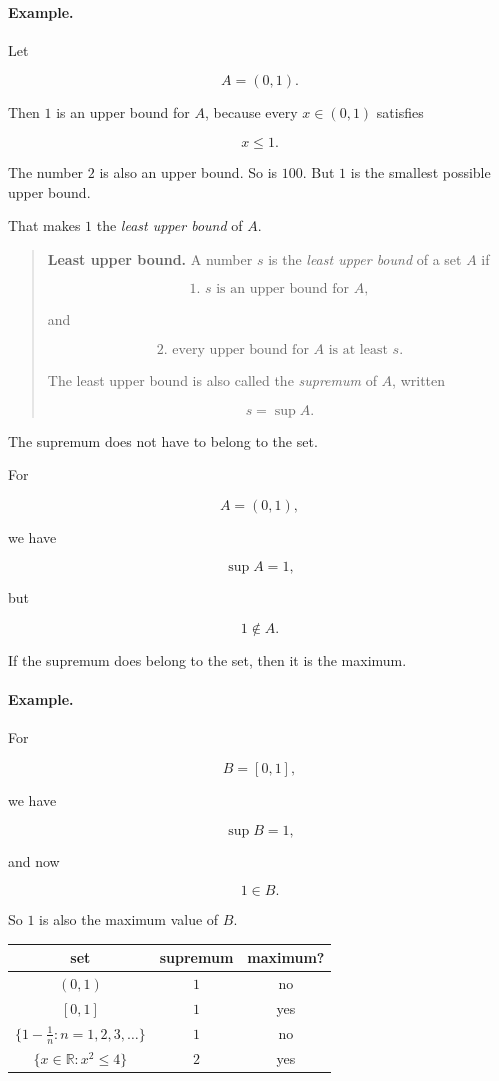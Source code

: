 \paragraph{Example.}
Let

\[
A=(0,1).
\]

Then \(1\) is an upper bound for \(A\), because every \(x\in(0,1)\) satisfies

\[
x\le1.
\]

The number \(2\) is also an upper bound.  So is \(100\).  But \(1\) is the smallest
possible upper bound.

That makes \(1\) the \emph{least upper bound} of \(A\).

\begin{quote}
\textbf{Least upper bound.}
A number \(s\) is the \emph{least upper bound} of a set \(A\) if

\[
\text{1. }s\text{ is an upper bound for }A,
\]

and

\[
\text{2. every upper bound for }A\text{ is at least }s.
\]

The least upper bound is also called the \emph{supremum} of \(A\), written

\[
\boxed{s=\sup A.}
\]
\end{quote}

The supremum does not have to belong to the set.

For

\[
A=(0,1),
\]

we have

\[
\sup A=1,
\]

but

\[
1\notin A.
\]

If the supremum does belong to the set, then it is the maximum.

\paragraph{Example.}
For

\[
B=[0,1],
\]

we have

\[
\sup B=1,
\]

and now

\[
1\in B.
\]

So \(1\) is also the maximum value of \(B\).

\begin{center}
\renewcommand{\arraystretch}{1.5}
\begin{tabular}{c|c|c}
\textbf{set} & \textbf{supremum} & \textbf{maximum?} \\ \hline
\((0,1)\) & \(1\) & no \\
\([0,1]\) & \(1\) & yes \\
\(\{1-\frac1n:n=1,2,3,\ldots\}\) & \(1\) & no \\
\(\{x\in\mathbb R:x^2\le4\}\) & \(2\) & yes
\end{tabular}
\end{center}

